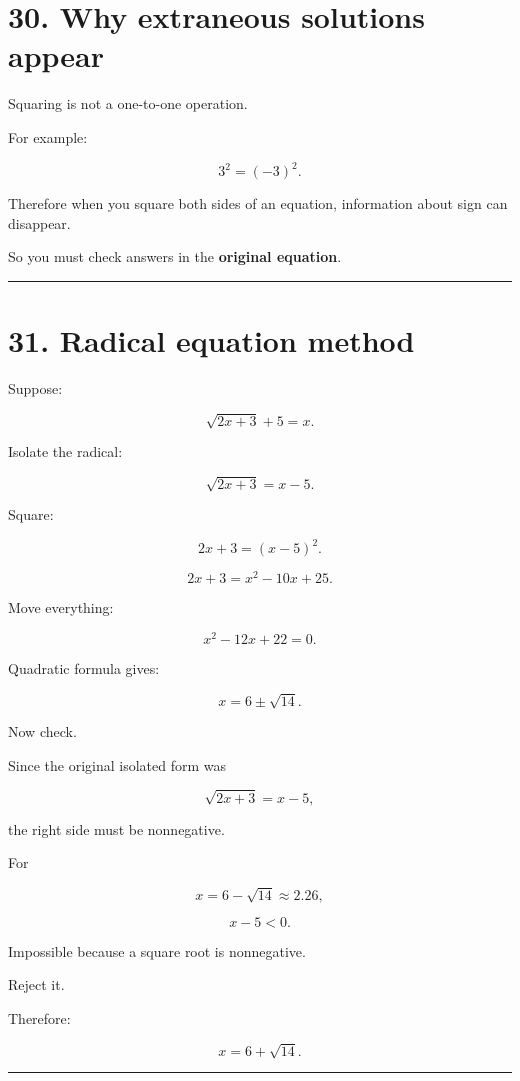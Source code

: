 \documentclass[
]{article}
\begin{document}
\section{30. Why extraneous solutions
appear}\label{why-extraneous-solutions-appear}

Squaring is not a one-to-one operation.

For example:

\[
3^2=(-3)^2.
\]

Therefore when you square both sides of an equation, information about
sign can disappear.

So you must check answers in the \textbf{original equation}.

\begin{center}\rule{0.5\linewidth}{0.5pt}\end{center}

\section{31. Radical equation method}\label{radical-equation-method}

Suppose:

\[
\sqrt{2x+3}+5=x.
\]

Isolate the radical:

\[
\sqrt{2x+3}=x-5.
\]

Square:

\[
2x+3=(x-5)^2.
\]

\[
2x+3=x^2-10x+25.
\]

Move everything:

\[
x^2-12x+22=0.
\]

Quadratic formula gives:

\[
x=6\pm\sqrt{14}.
\]

Now check.

Since the original isolated form was

\[
\sqrt{2x+3}=x-5,
\]

the right side must be nonnegative.

For

\[
x=6-\sqrt{14}\approx2.26,
\]

\[
x-5<0.
\]

Impossible because a square root is nonnegative.

Reject it.

Therefore:

\[
\boxed{x=6+\sqrt{14}}.
\]

\begin{center}\rule{0.5\linewidth}{0.5pt}\end{center}
\end{document}
